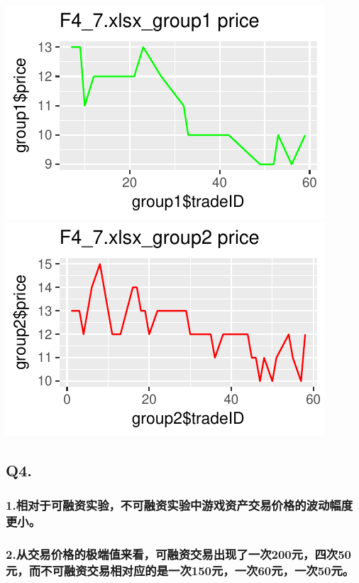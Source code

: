 \documentclass[]{article}
\begin{document}
\includegraphics{finance_homework_files/figure-latex/unnamed-chunk-5-9.pdf}
\includegraphics{finance_homework_files/figure-latex/unnamed-chunk-5-10.pdf}

\newpage

\subsection{Q4.}\label{q4.}

\subsubsection{1.相对于可融资实验，不可融资实验中游戏资产交易价格的波动幅度更小。}

\subsubsection{2.从交易价格的极端值来看，可融资交易出现了一次200元，四次50元，而不可融资交易相对应的是一次150元，一次60元，一次50元。}\label{200501506050}
\end{document}
